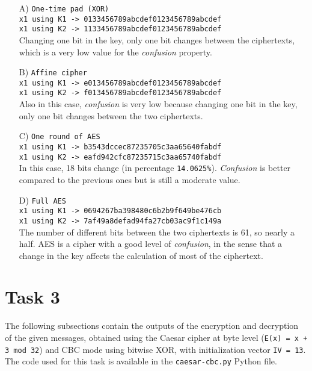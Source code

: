 \documentclass{article}
\begin{document}
\begin{itemize}
    \item [A)] \texttt{One-time pad (XOR)} \\
    \texttt{x1 using K1 -> 0133456789abcdef0123456789abcdef} \\
    \texttt{x1 using K2 -> 1133456789abcdef0123456789abcdef} \\
    Changing one bit in the key, only one bit changes between the ciphertexts, which is a very low value for the \textit{confusion} property.

    \item [B)] \texttt{Affine cipher} \\
    \texttt{x1 using K1 -> e013456789abcdef0123456789abcdef} \\
    \texttt{x1 using K2 -> f013456789abcdef0123456789abcdef} \\
    Also in this case, \textit{confusion} is very low because changing one bit in the key, only one bit changes between the two ciphertexts.
    
    \item [C)] \texttt{One round of AES} \\
    \texttt{x1 using K1 -> b3543dccec87235705c3aa65640fabdf} \\
    \texttt{x1 using K2 -> eafd942cfc87235715c3aa65740fabdf} \\
    In this case, 18 bits change (in percentage \texttt{14.0625\%}). \textit{Confusion} is better compared to the previous ones but is still a moderate value.
    
    \item [D)] \texttt{Full AES} \\
    \texttt{x1 using K1 -> 0694267ba398480c6b2b9f649be476cb} \\
    \texttt{x1 using K2 -> 7af49a8defad94fa27cb03ac9f1c149a} \\
    The number of different bits between the two ciphertexts is 61, so nearly a half. AES is a cipher with a good level of \textit{confusion}, in the sense that a change in the key affects the calculation of most of the ciphertext.
    
\end{itemize}

\section{Task 3}
The following subsections contain the outputs of the encryption and decryption of the given messages, obtained using the Caesar cipher at byte level (\texttt{E(x) = x + 3 mod 32}) and CBC mode using bitwise XOR, with initialization vector \texttt{IV = 13}. \\
The code used for this task is available in the \texttt{caesar-cbc.py} Python file.
\end{document}
